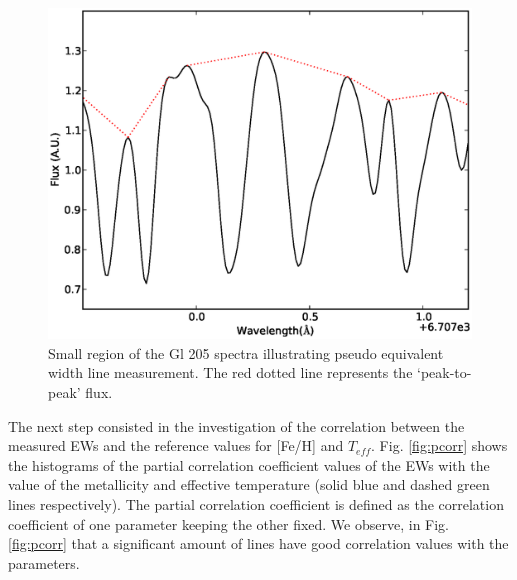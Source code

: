 \documentclass[referee]{aa}
\begin{document}
\begin{figure}[h]
\begin{center}
\includegraphics[scale=0.45]{pics/template.eps}
\end{center}
\caption{Small region of the Gl 205 spectra illustrating pseudo equivalent width line measurement. The red dotted line represents the `peak-to-peak' flux.}
\label{fig:spec}
\end{figure}

The next step consisted in the investigation of the correlation between the measured EWs and the reference values for [Fe/H] and $T_{eff}$. Fig. \ref{fig:pcorr} shows the histograms of the partial correlation coefficient values of the EWs with the value of the metallicity and effective temperature (solid blue and dashed green lines respectively). The partial correlation coefficient is defined as the correlation coefficient of one parameter keeping the other fixed. %
We observe, in Fig. \ref{fig:pcorr} that a significant amount of lines have good correlation values with the parameters. 
\end{document}
